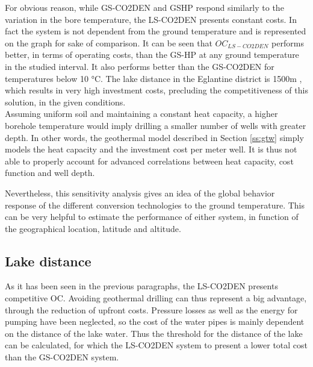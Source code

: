 \documentclass{article}
\begin{document}
For obvious reason, while GS-CO2DEN and GSHP respond similarly to the variation in the bore temperature, the LS-CO2DEN presents constant costs. In fact the system is not dependent from the ground temperature and is represented on the graph for sake of comparison. It can be seen that $OC_{LS-CO2DEN}$ performs better, in terms of operating costs, than the GS-HP at any ground temperature in the studied interval. It also performs better than the GS-CO2DEN for temperatures below 10 \si{\celsius}. The lake distance in the Eglantine district is 1500m , which results in very high investment costs, precluding the competitiveness of this solution, in the given conditions.\\

Assuming uniform soil and maintaining a constant heat capacity, a higher borehole temperature would imply drilling a smaller number of wells with greater depth. In other words, the geothermal model described in Section \ref{ss:gtw} simply models the heat capacity and the investment cost per meter well. It is thus not able to properly account for advanced correlations between heat capacity, cost function and well depth.

Nevertheless, this sensitivity analysis gives an idea of the global behavior response of the different conversion technologies to the ground temperature. This can be very helpful to estimate the performance of either system, in function of the geographical location, latitude and altitude.


\subsection{Lake distance}


As it has been seen in the previous paragraphs, the LS-CO2DEN presents competitive OC. Avoiding geothermal drilling can thus represent a big advantage, through the reduction of upfront costs. Pressure losses as well as the energy for pumping have been neglected, so the cost of the water pipes is mainly dependent on the distance of the lake water. Thus the threshold for the distance of the lake can be calculated, for which the LS-CO2DEN system to present a lower total cost than the GS-CO2DEN system. 
\end{document}

